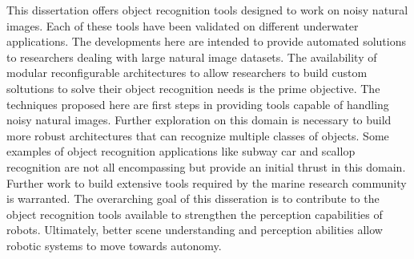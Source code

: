\documentclass {udthesis}
\begin{document}
This dissertation offers object recognition tools designed to work on noisy natural images. Each of these tools have been validated on different underwater applications. The developments here are intended to provide automated solutions to researchers dealing with large natural image datasets.
The availability of modular reconfigurable architectures to allow researchers to build custom soltutions to solve their object recognition needs is the prime objective. The techniques proposed here are first steps in providing tools capable of handling noisy natural images. Further exploration on this domain is necessary to build more robust architectures that can recognize multiple classes of objects. Some examples of object recognition applications like subway car and scallop recognition are not all encompassing but provide an initial thrust in this domain. Further work to build extensive tools required by the marine research community is warranted. The overarching goal of this disseration is to contribute to the object recognition 
tools available to strengthen the perception capabilities of robots. Ultimately, better scene understanding and perception abilities allow robotic systems to move towards autonomy.


\printglossary[type=\acronymtype]                  
\end{document}
